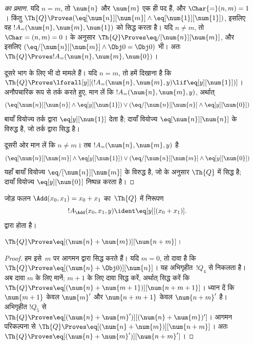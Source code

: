 \documentclass[../../../include/open-logic-section]{subfiles}
\begin{document}
\begin{proof}[ का प्रमाण]
यदि $n = m$, तो $\num{n}$ और $\num{m}$ एक ही पद हैं, और
$\Char{=}(n, m) = 1$। किंतु
$\Th{Q} \Proves (\eq[\num{n}][\num{m}] \land
\eq[\num{1}][\num{1}])$, इसलिए वह
$!A_=(\num{n}, \num{m}, \num{1})$ को सिद्ध करता है। यदि $n \neq m$,
तो $\Char=(n, m) = 0$।  के अनुसार
$\Th{Q} \Proves \eq/[\num{n}][\num{m}]$, और इसलिए
$(\eq/[\num{n}][\num{m}] \land \Obj 0 = \Obj 0)$ भी। अतः
$\Th{Q} \Proves !A_=(\num{n}, \num{m}, \num{0})$।

दूसरे भाग के लिए भी दो मामले हैं। यदि $n = m$, तो हमें दिखाना है कि
$\Th{Q} \Proves \lforall[y][(!A_=(\num{n}, \num{m}, y)
  \lif \eq[y][\num{1}])]$। अनौपचारिक रूप से तर्क करते हुए, मान लें कि
$!A_=(\num{n}, \num{m}, y)$, अर्थात्
\[
(\eq[\num{n}][\num{n}] \land \eq[y][\num{1}]) \lor
(\eq/[\num{n}][\num{n}] \land \eq[y][\num{0}])
\]
बायाँ वियोज्य तर्क द्वारा $\eq[y][\num{1}]$ देता है; दायाँ वियोज्य
$\eq[\num{n}][\num{n}]$ के विरुद्ध है, जो तर्क द्वारा सिद्ध है।

दूसरी ओर मान लें कि $n \neq m$। तब $!A_=(\num{n}, \num{m}, y)$ है
\[
(\eq[\num{n}][\num{m}] \land \eq[y][\num{1}]) \lor
(\eq/[\num{n}][\num{m}] \land \eq[y][\num{0}])
\]
यहाँ बायाँ वियोज्य $\eq/[\num{n}][\num{m}]$ के विरुद्ध है, जो
 के अनुसार $\Th{Q}$ में सिद्ध है; दायाँ वियोज्य
$\eq[y][\num{0}]$ निष्पन्न करता है।
\end{proof}

\begin{prop}
जोड़ फलन $\Add(x_0, x_1) = x_0+x_1$ का~$\Th{Q}$ में निरूपण
\[
  !A_{\Add}(x_0, x_1, y) \ident \eq[y][(x_0 + x_1)].
\]
द्वारा होता है।
\end{prop}

\begin{lem}
$\Th{Q} \Proves \eq[(\num{n} + \num{m})][\num{n+m}]$।
\end{lem}

\begin{proof}
हम इसे~$m$ पर आगमन द्वारा सिद्ध करते हैं। यदि $m = 0$, तो दावा है कि
$\Th{Q} \Proves \eq[(\num{n} + \Obj 0)][\num{n}]$। यह अभिगृहीत~$!Q_4$
से निकलता है। अब दावा $m$ के लिए मानें; $m+1$ के लिए दावा सिद्ध करें,
अर्थात् सिद्ध करें कि
$\Th{Q} \Proves \eq[(\num{n} + \num{m+1})][\num{n+m+1}]$। ध्यान दें कि
$\num{m+1}$ केवल $\num{m}'$ और $\num{n+m+1}$ केवल $\num{n+m}'$ है।
अभिगृहीत $!Q_5$ से
$\Th{Q} \Proves \eq[(\num{n} + \num{m}')][(\num{n}+\num{m})']$। आगमन
परिकल्पना से
$\Th{Q} \Proves \eq[(\num{n} + \num{m})][\num{n+m}]$। अतः
$\Th{Q} \Proves \eq[(\num{n} + \num{m}')][\num{n+m}']$।
\end{proof}
\end{document}
